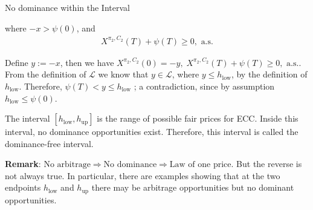 \documentclass{beamer}
\begin{document}
\begin{frame}{No dominance within the Interval}

    {\footnotesize \footnotesize
    \par where $-x > \psi(0)$, and
    \begin{align*}
        X^{\pi_2, C_2}(T) + \psi(T) \geq 0, \text{ a.s.}
    \end{align*}
    \par \pause  Define $y := -x$, then we have $ X^{\pi_2, C_2}(0) = -y, \; X^{\pi_2, C_2}(T) + \psi(T) \geq 0, \text{ a.s.}$. 
    From the definition of $\mathcal{L}$ we know that $y \in \mathcal{L}$, 
    where $y \leq h_{\text{low}}$, by the definition of $h_{\text{low}}$. Therefore, $\psi(T) < y \leq h_{\text{low}}$
    ; a contradiction, since by assumption $h_{\text{low}} \leq \psi(0)$.
    \vspace{1em}
    \par  \pause The interval $[h_{\text{low}}, h_{\text{up}}]$ is the  range of possible fair prices  for ECC. 
    Inside this interval, no dominance opportunities exist. Therefore, this interval is called the dominance-free interval.
    \vspace{1em}
    \par \pause  \textbf{Remark}: $\text{No arbitrage} \Rightarrow \text{No dominance} \Rightarrow \text{Law of one price}$.
    But the reverse is not always true. In particular, 
    there are examples showing that at the two endpoints $h_{\text{low}}$ and $h_{\text{up}}$ 
    there may be arbitrage opportunities but no dominant opportunities.

    }

\end{frame} 
\end{document}
